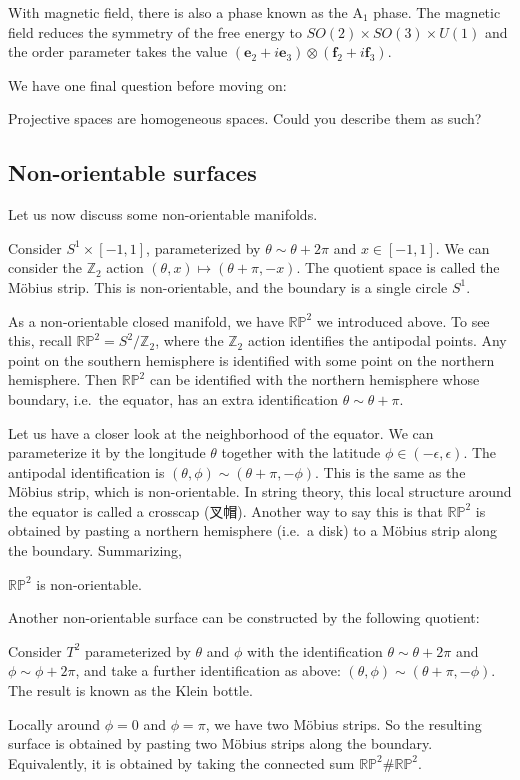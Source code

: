 \documentclass[12pt]{article}
\numberwithin{equation}{section}
\theoremstyle{remark}
\def\bZ{\mathbb{Z}}
\def\RP{\mathbb{RP}}
\begin{document}
With magnetic field, there is also a phase known as the A$_1$ phase.
The magnetic field reduces the symmetry of the free energy
to $SO(2)\times SO(3)\times U(1)$
and the order parameter takes the value 
 $(\mathbf{e}_2+i\mathbf{e}_3) \otimes (\mathbf{f}_2+ i\mathbf{f}_3)$.

We have one final question before moving on:
\begin{question}
Projective spaces are homogeneous spaces. Could you describe them as such?
\end{question}


\subsection{Non-orientable surfaces}

Let us now discuss some non-orientable manifolds.

\begin{example}
  Consider $S^1\times [-1,1]$, parameterized by $\theta\sim \theta+2\pi$ and $x\in [-1,1]$.
  We can consider the $\bZ_2$ action $(\theta,x)\mapsto (\theta+\pi,-x)$.
  The quotient space is called the M\"obius strip.
  This is non-orientable, and the boundary is a single circle $S^1$.
\end{example}

As a non-orientable closed manifold, 
we have $\RP^2$ we introduced above. To see this, recall $\RP^2=S^2/\bZ_2$,
where the $\bZ_2$ action identifies the antipodal points. 
Any point on the southern hemisphere is identified with some point on the northern hemisphere.
Then $\RP^2$ can be identified with the northern hemisphere
whose boundary, i.e.~the equator, has an extra identification $\theta \sim \theta+\pi$.

Let us have a closer look at the neighborhood of the equator.
We can parameterize it by the longitude $\theta$ together with the latitude $\phi\in (-\epsilon,\epsilon)$.
The antipodal identification is $(\theta,\phi)\sim (\theta+\pi,-\phi)$.
This is the same as the M\"obius strip, which is non-orientable.
In string theory, this local structure around the equator is called a crosscap (叉帽).
Another way to say this is that $\RP^2$ is obtained by pasting a northern hemisphere (i.e.~a disk)
to a M\"obius strip along the boundary.
Summarizing,
\begin{proposition}
$\RP^2$ is non-orientable.
\end{proposition}

Another non-orientable surface can be constructed by the following quotient:
\begin{example}
Consider $T^2$ parameterized by $\theta$ and $\phi$
with the identification $\theta\sim \theta+2\pi$ and $\phi \sim \phi+2\pi$,
and take a further identification as above: $(\theta,\phi)\sim (\theta+\pi,-\phi)$.
The result is known as the Klein bottle.
\end{example}
Locally around $\phi=0$ and $\phi=\pi$, we have two M\"obius strips.
So the resulting surface is obtained by pasting two M\"obius strips along the boundary.
Equivalently, it is obtained by taking the connected sum $\RP^2\#\RP^2$.
\end{document}
